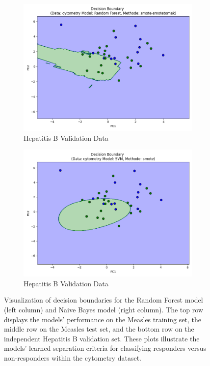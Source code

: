 \documentclass[12pt,a4paper]{report}
\begin{document}
\begin{figure}[h!]
    \vspace{1em}

    \begin{subfigure}[b]{0.49\textwidth}
        \centering
        \includegraphics[width=\textwidth]{images/val_decision_boundary_H.png}
        \caption{Hepatitis B Validation Data}
        \label{fig:val_decision_boundary_H}
    \end{subfigure}
    \hfill
    \begin{subfigure}[b]{0.49\textwidth}
        \centering
        \includegraphics[width=\linewidth]{images/val2_decision_boundary_H.png}
        \caption{Hepatitis B Validation Data}
        \label{fig:val2_decision_boundary_H}
    \end{subfigure}

    \caption[Decision Boundaries of Predictive Models Across Datasets]{Visualization of decision boundaries for the Random Forest model (left column) and Naive Bayes model (right column). The top row displays the models' performance on the Measles training set, the middle row on the Measles test set, and the bottom row on the independent Hepatitis B validation set. These plots illustrate the models' learned separation criteria for classifying responders versus non-responders within the cytometry dataset.}
    \label{fig:decision_boundary_validation}
\end{figure}
\end{document}
